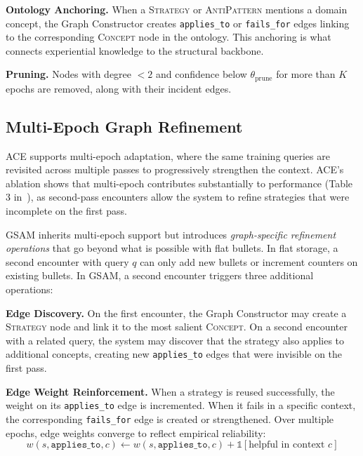 \documentclass[12pt,a4paper]{article}
\begin{document}
\textbf{Ontology Anchoring.} When a \textsc{Strategy} or \textsc{AntiPattern} mentions a domain concept, the Graph Constructor creates \texttt{applies\_to} or \texttt{fails\_for} edges linking to the corresponding \textsc{Concept} node in the ontology. This anchoring is what connects experiential knowledge to the structural backbone.

\textbf{Pruning.} Nodes with degree $< 2$ and confidence below $\theta_{\text{prune}}$ for more than $K$ epochs are removed, along with their incident edges.


\subsection{Multi-Epoch Graph Refinement}
\label{sec:multiepoch}

ACE supports multi-epoch adaptation, where the same training queries are revisited across multiple passes to progressively strengthen the context. ACE's ablation shows that multi-epoch contributes substantially to performance (Table 3 in~\cite{ace2025}), as second-pass encounters allow the system to refine strategies that were incomplete on the first pass.

GSAM inherits multi-epoch support but introduces \textit{graph-specific refinement operations} that go beyond what is possible with flat bullets. In flat storage, a second encounter with query $q$ can only add new bullets or increment counters on existing bullets. In GSAM, a second encounter triggers three additional operations:

\textbf{Edge Discovery.} On the first encounter, the Graph Constructor may create a \textsc{Strategy} node and link it to the most salient \textsc{Concept}. On a second encounter with a related query, the system may discover that the strategy also applies to additional concepts, creating new \texttt{applies\_to} edges that were invisible on the first pass.

\textbf{Edge Weight Reinforcement.} When a strategy is reused successfully, the weight on its \texttt{applies\_to} edge is incremented. When it fails in a specific context, the corresponding \texttt{fails\_for} edge is created or strengthened. Over multiple epochs, edge weights converge to reflect empirical reliability:
\begin{equation}
w(s, \texttt{applies\_to}, c) \leftarrow w(s, \texttt{applies\_to}, c) + \mathbb{1}[\text{helpful in context } c]
\end{equation}
\end{document}
